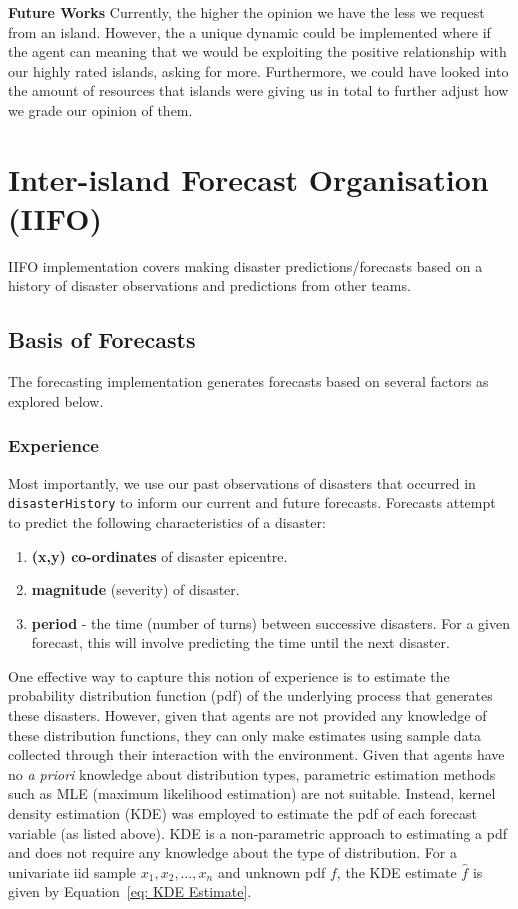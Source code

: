 {\textbf{Future Works}}\newline
Currently, the higher the opinion we have the less we request from an island. However, the a unique dynamic could be implemented where if the agent can meaning that we would be exploiting the positive relationship with our highly rated islands, asking for more. Furthermore, we could have looked into the amount of resources that islands were giving us in total to further adjust how we grade our opinion of them. 

\section{Inter-island Forecast Organisation (IIFO)}

IIFO implementation covers making disaster predictions/forecasts based on a history of disaster observations and predictions from other teams. 

\subsection{Basis of Forecasts}
The forecasting implementation generates forecasts based on several factors as explored below.

\subsubsection{Experience}
Most importantly, we use our past observations of disasters that occurred in \texttt{disasterHistory} to inform our current and future forecasts. Forecasts attempt to predict the following characteristics of a disaster:
\begin{enumerate}
    \item\textbf{(x,y) co-ordinates} of disaster epicentre.
    \item \textbf{magnitude} (severity) of disaster.
    \item \textbf{period} - the time (number of turns) between successive disasters. For a given forecast, this will involve predicting the time until the next disaster.
\end{enumerate}

One effective way to capture this notion of experience is to estimate the probability distribution function (pdf) of the underlying process that generates these disasters. However, given that agents are not provided any knowledge of these distribution functions, they can only make estimates using sample data collected through their interaction with the environment. Given that agents have no \textit{a priori} knowledge about distribution types, parametric estimation methods such as MLE (maximum likelihood estimation) are not suitable. Instead, kernel density estimation (KDE) was employed to estimate the pdf of each forecast variable (as listed above). KDE is a non-parametric approach to estimating a pdf and does not require any knowledge about the type of distribution. For a univariate iid sample $x_1, x_2, \dots, x_n$ and unknown pdf $f$, the KDE estimate $\widehat{f}$ is given by Equation~\ref{eq: KDE Estimate}.

